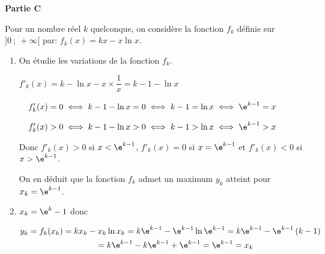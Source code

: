 \bigskip

\textbf{Partie C}

\medskip

Pour un nombre réel $k$ quelconque, on considère la fonction $f_k$ définie sur $]0~;~+\infty[$ par:
$f_k(x) = kx - x \ln x.$

\begin{enumerate}
\item 

On étudie les variations de la fonction $f_k$.

$f'_k(x)=k - \ln x - x\times \dfrac{1}{x}= k-1 -\ln x$

\textbullet~~$f'_k(x) = 0 \iff k-1-\ln x = 0 \iff k-1 = \ln x \iff \e^{k-1}=x$

\textbullet~~$f'_k(x) > 0 \iff k-1-\ln x > 0 \iff k-1 > \ln x \iff \e^{k-1}>x$

Donc $f'_k(x)>0$ si $x<\e^{k-1}$, $f'_k(x)=0$ si $x=\e^{k-1}$ et $f'_k(x)<0$ si $x>\e^{k-1}$.

On en déduit que la fonction $f_k$ admet un maximum $y_k$ atteint pour $x_k=\e^{k-1}$.

\item  
$x_k = \e^k- 1$ donc 

$\begin{gathered}y_k=f_k(x_k) = kx_k - x_k \ln x_k
=k \e^{k- 1} -  \e^{k- 1}\ln \e^{k- 1}
= k\e^{k-1} - \e^{k- 1}\left (k-1\right )\\
\phantom{y_k}
=  k\e^{k-1} -  k\e^{k-1} +  \e^{k-1}
=\e^{k-1}
=x_k
\end{gathered}$


\end{enumerate}

\bigskip
